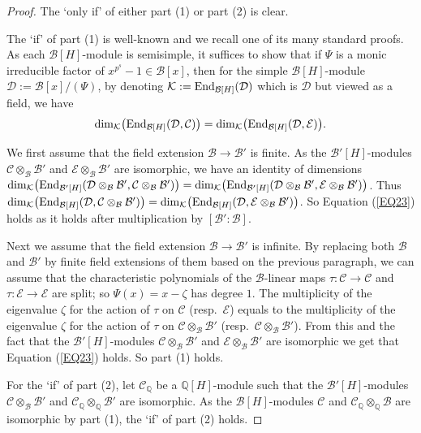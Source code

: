 \documentclass[11pt]{amsart}
\def\End{\textup{End}}
\begin{document}
\begin{proof}
The `only if' of either part (1) or part (2) is clear.

The `if' of part (1) is well-known and we recall one of its many standard proofs. As each $\mathcal B[H]$-module is semisimple, it suffices to show that if $\Psi$ is a monic irreducible factor of $x^{p^s}-1\in \mathcal B[x]$, then for the simple $\mathcal B[H]$-module $\mathcal D:=\mathcal B[x]/(\Psi)$, by denoting $\mathcal K:=\End_{\mathcal B[H]}(\mathcal D)$ which is $\mathcal D$ but viewed as a field, we have 
\begin{equation}\label{EQ23}
\dim_{\mathcal K}\bigl(\End_{\mathcal B[H]}(\mathcal D,\mathcal C)\bigr)=\dim_{\mathcal K}\bigl(\End_{\mathcal B[H]}(\mathcal D,\mathcal E)\bigr).
\end{equation}

We first assume that the field extension $\mathcal B\rightarrow\mathcal B'$ is finite. As the $\mathcal B'[H]$-modules $\mathcal C\otimes_\mathcal B \mathcal B'$ and $\mathcal E\otimes_\mathcal B \mathcal B'$ are isomorphic, we have an identity of dimensions $\dim_{\mathcal K}\bigl(\End_{\mathcal B'[H]}(\mathcal D\otimes_\mathcal B \mathcal B',\mathcal C\otimes_\mathcal B \mathcal B')\bigr)=\dim_{\mathcal K}\bigl(\End_{\mathcal B'[H]}(\mathcal D\otimes_\mathcal B \mathcal B',\mathcal E\otimes_\mathcal B \mathcal B')\bigr)$. Thus
$\dim_{\mathcal K}\bigl(\End_{\mathcal B[H]}(\mathcal D,\mathcal C\otimes_\mathcal B \mathcal B')\bigr)=\dim_{\mathcal K}\bigl(\End_{\mathcal B[H]}(\mathcal D,\mathcal E\otimes_\mathcal B \mathcal B')\bigr)$. So Equation (\ref{EQ23}) holds as it holds after multiplication by $[\mathcal B':\mathcal B]$. 

Next we assume that the field extension $\mathcal B\rightarrow\mathcal B'$ is infinite. By replacing both $\mathcal B$ and $\mathcal B'$ by finite field extensions of them based on the previous paragraph, we can assume that the characteristic polynomials of the $\mathcal B$-linear maps $\tau:\mathcal C\rightarrow\mathcal C$ and $\tau:\mathcal E\rightarrow\mathcal E$ are split; so $\Psi(x)=x-\zeta$ has degree $1$. The multiplicity of the eigenvalue $\zeta$ for the action of $\tau$ on $\mathcal C$ (resp.\ $\mathcal E$) equals to the multiplicity of the eigenvalue $\zeta$ for the action of $\tau$ on $\mathcal C\otimes_{\mathcal B} \mathcal B'$ (resp.\ $\mathcal C\otimes_{\mathcal B} \mathcal B'$). From this and the fact that the $\mathcal B'[H]$-modules $\mathcal C\otimes_\mathcal B \mathcal B'$ and $\mathcal E\otimes_\mathcal B \mathcal B'$ are isomorphic we get that Equation (\ref{EQ23}) holds. So part (1) holds. 

For the `if' of part (2), let $\mathcal C_{\mathbb Q}$ be a $\mathbb Q[H]$-module such that the $\mathcal B'[H]$-modules $\mathcal C\otimes_\mathcal B \mathcal B'$ and $\mathcal C_{\mathbb Q}\otimes_{\mathbb Q} \mathcal B'$ are isomorphic. As the $\mathcal B[H]$-modules $\mathcal C$ and $\mathcal C_{\mathbb Q}\otimes_{\mathbb Q} \mathcal B$ are isomorphic by part (1), the `if' of part (2) holds.
\end{proof}
\end{document}
